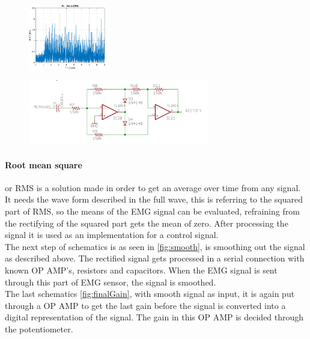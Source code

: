 \begin{multicols}{2}
\begin{figure}[H]
    \centering
   \includegraphics[width=0.3\textwidth]{Figures/EMG/epsFig}
    \caption{}
\end{figure} 
\columnbreak
\begin{figure}[H]
    \centering
    \includegraphics[width=0.7\textwidth]{Figures/EMG/Rect.PNG}
    \caption{\cite{SparkfunScematicEMG}}
    \label{fig:rect}
\end{figure} 
\end{multicols} 
\paragraph{Root mean square} or RMS is a solution made in order to get an average over time from any signal. It needs the wave form described in the full wave, this is referring to the squared part of RMS, so the means of the EMG signal can be evaluated, refraining from the rectifying of the squared part gets the mean of zero\cite{RMS}. After processing the signal it
is used as an implementation for a control signal.\\
The next step of schematics is as seen in \ref{fig:smooth}, is smoothing out the signal as described above. The rectified signal gets processed in a serial connection with known OP AMP's, resistors and capacitors. When the EMG signal is sent through this part of EMG sensor, the signal is smoothed.\\
The last schematics \ref{fig:finalGain}, with smooth signal as input, it is again put through a OP AMP to get the last gain before the signal is converted into a digital representation of the signal. The gain in this OP AMP is decided through the potentiometer.\\


